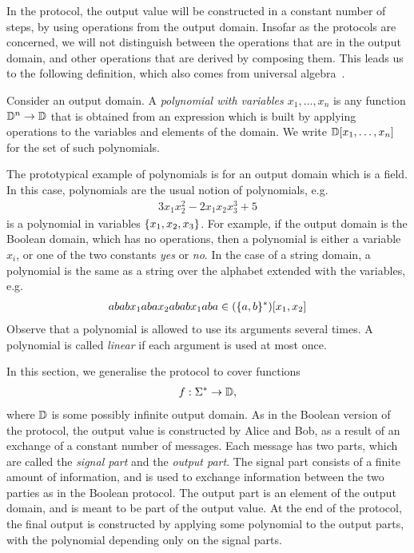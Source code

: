 In the protocol, the output value will be constructed in a constant number of steps, by using operations from the output domain. Insofar as the protocols are concerned, we will not distinguish between the  operations that are in the output domain, and other operations that are derived by composing them. This leads us to the following definition, which also comes from universal algebra~\cite[p.6]{hobby1988structure}.

\begin{definition}[Polynomials]\label{def:polynomials}
    Consider an output domain. A \emph{polynomial with variables $x_1,\ldots,x_n$} is any function $\mathbb D^n \to \mathbb D$ that is obtained from an expression which is built by applying operations to the variables and elements of the domain. We write $\mathbb D[x_1,\ldots,x_n]$ for the set of such polynomials.
\end{definition}

\begin{myexample}
    The prototypical example of polynomials is for an output domain which is a field. In this case, polynomials are the usual notion of polynomials, e.g. 
\begin{align*}
3x_1x_2^2 - 2x_1x_2x_3^3 + 5
\end{align*}
is a polynomial in variables $\{x_1,x_2,x_3\}$. 
For example, if the output domain is the Boolean domain, which has no operations, then a polynomial is either a variable $x_i$, or one of the two constants \emph{yes} or \emph{no}. In the case of a string domain, a polynomial is the same as a string over the alphabet extended with the variables, e.g.
\begin{align*}
ababx_1abax_2ababx_1aba \in (\{a,b\}^*)[x_1,x_2]
\end{align*}
Observe that a polynomial is allowed to use its arguments several times. A polynomial is called \emph{linear} if each argument is used at most once.
\end{myexample}



In this section, we generalise the protocol to cover functions 
\begin{align*}
f : \Sigma^* \to \mathbb D,
\end{align*}
where $\mathbb D$ is some possibly infinite output domain. As in the Boolean version of the protocol, the output value is constructed by Alice and Bob, as a result of an exchange of a constant number of messages. Each message has two parts, which are called the \emph{signal part} and the \emph{output part}. The signal part consists of a finite amount of information, and is used to exchange information between the two parties as in the Boolean protocol. The output part is an element of the output domain, and  is meant to be part of the output value. At the end of the protocol, the final output is constructed by applying some polynomial to the output parts, with the polynomial depending only on the signal parts. 

